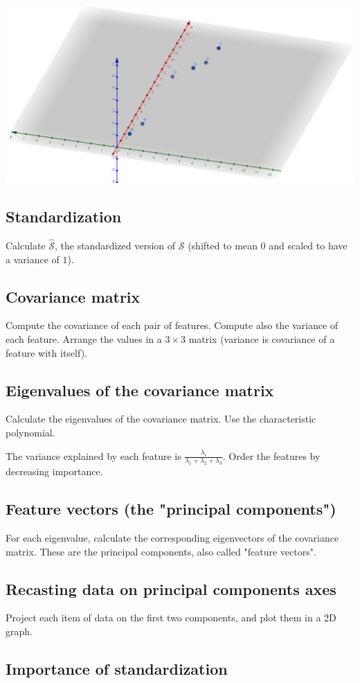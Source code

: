 \documentclass[]{article}
\begin{document}
	\begin{center}
		\vspace{0.2cm}
		\includegraphics[width=0.95\linewidth]{points}
		\vspace{0.2cm}
	\end{center}
	
	\subsection{Standardization}
	Calculate $\hat{\mathcal{S}}$, the standardized version of $\mathcal{S}$ (shifted to mean $0$ and scaled to have a variance of $1$).
	
	\subsection{Covariance matrix}
	Compute the covariance of each pair of features.
	Compute also the variance of each feature.
	Arrange the values in a $3 \times 3$ matrix (variance is covariance of a feature with itself).
	
	\subsection{Eigenvalues of the covariance matrix}
	Calculate the eigenvalues of the covariance matrix.
	Use the characteristic polynomial.
	
	The variance explained by each feature is $\frac{\lambda_i}{\lambda_1+\lambda_2+\lambda_3}$.
	Order the features by decreasing importance.
	
	\subsection{Feature vectors (the "principal components")}
	For each eigenvalue, calculate the corresponding eigenvectors of the covariance matrix.
	These are the principal components, also called "feature vectors".
	
	\subsection{Recasting data on principal components axes}
	Project each item of data on the first two components, and plot them in a 2D graph.
	
	\subsection{Importance of standardization}
\end{document}
